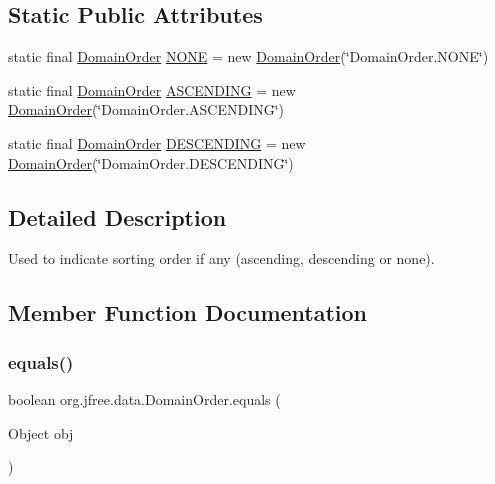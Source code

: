 \subsection*{Static Public Attributes}
\begin{DoxyCompactItemize}
\item 
static final \mbox{\hyperlink{classorg_1_1jfree_1_1data_1_1_domain_order}{Domain\+Order}} \mbox{\hyperlink{classorg_1_1jfree_1_1data_1_1_domain_order_a3e1bac41a165ed944192559f61ac6c20}{N\+O\+NE}} = new \mbox{\hyperlink{classorg_1_1jfree_1_1data_1_1_domain_order}{Domain\+Order}}(\char`\"{}Domain\+Order.\+N\+O\+NE\char`\"{})
\item 
static final \mbox{\hyperlink{classorg_1_1jfree_1_1data_1_1_domain_order}{Domain\+Order}} \mbox{\hyperlink{classorg_1_1jfree_1_1data_1_1_domain_order_a6ae95cc575e12e1a68d624ac02ba1aaf}{A\+S\+C\+E\+N\+D\+I\+NG}} = new \mbox{\hyperlink{classorg_1_1jfree_1_1data_1_1_domain_order}{Domain\+Order}}(\char`\"{}Domain\+Order.\+A\+S\+C\+E\+N\+D\+I\+NG\char`\"{})
\item 
static final \mbox{\hyperlink{classorg_1_1jfree_1_1data_1_1_domain_order}{Domain\+Order}} \mbox{\hyperlink{classorg_1_1jfree_1_1data_1_1_domain_order_acfe6e8ef183030ec1b2c1f907fe3d916}{D\+E\+S\+C\+E\+N\+D\+I\+NG}} = new \mbox{\hyperlink{classorg_1_1jfree_1_1data_1_1_domain_order}{Domain\+Order}}(\char`\"{}Domain\+Order.\+D\+E\+S\+C\+E\+N\+D\+I\+NG\char`\"{})
\end{DoxyCompactItemize}


\subsection{Detailed Description}
Used to indicate sorting order if any (ascending, descending or none). 

\subsection{Member Function Documentation}
\mbox{\label{classorg_1_1jfree_1_1data_1_1_domain_order_ad784e532580556a4a871e3133ba8873f}} 
\subsubsection{\texorpdfstring{equals()}{equals()}}
{\footnotesize\ttfamily boolean org.\+jfree.\+data.\+Domain\+Order.\+equals (\begin{DoxyParamCaption}\item[{Object}]{obj }\end{DoxyParamCaption})}

